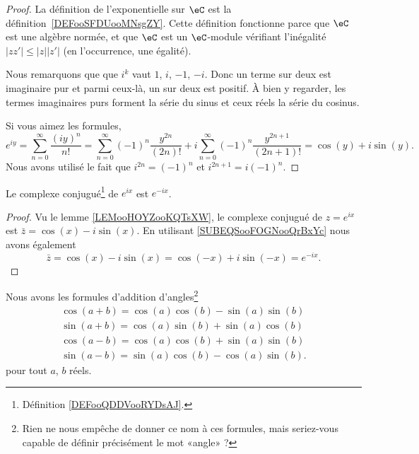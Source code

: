\begin{proof}
    La définition de l'exponentielle sur \( \eC\) est la définition~\ref{DEFooSFDUooMNsgZY}. Cette définition fonctionne parce que \( \eC\) est une algèbre normée, et que \( \eC\) est un \( \eC\)-module vérifiant l'inégalité \(  | zz' |\leq | z | |z' | \) (en l'occurrence, une égalité).

    Nous remarquons que que \( i^k\) vaut \( 1\), \( i\), \( -1\), \( -i\). Donc un terme sur deux est imaginaire pur et parmi ceux-là, un sur deux est positif. À bien y regarder, les termes imaginaires purs forment la série du sinus et ceux réels la série du cosinus.

    Si vous aimez les formules,
    \begin{equation}
            e^{iy}=\sum_{n=0}^{\infty}\frac{ (iy)^n }{ n! }
            =\sum_{n=0}^{\infty}(-1)^n\frac{ y^{2n} }{ (2n)! }+i\sum_{n=0}^{\infty}(-1)^n\frac{ y^{2n+1} }{ (2n+1)! }
            =\cos(y)+i\sin(y).
    \end{equation}
    Nous avons utilisé le fait que \( i^{2n}=(-1)^n\) et \( i^{2n+1}=i(-1)^n\).
\end{proof}

\begin{corollary}       \label{CORooWZFIooDTCoRo}
    Le complexe conjugué\footnote{Définition \ref{DEFooQDDVooRYDsAJ}.} de \(  e^{ix}\) est \(  e^{-ix}\).
\end{corollary}

\begin{proof}
    Vu le lemme \ref{LEMooHOYZooKQTsXW}, le complexe conjugué de \(  z=e^{ix}\) est \(\bar z= \cos(x)-i\sin(x)\). En utilisant \eqref{SUBEQSooFOGNooQrBxYc} nous avons également
    \begin{equation}
        \bar z=\cos(x)-i\sin(x)=\cos(-x)+i\sin(-x)= e^{-ix}.
    \end{equation}
\end{proof}

\begin{lemma}       \label{LEMooJAWBooJGfZIL}
    Nous avons les formules d'addition d'angles\footnote{Rien ne nous empêche de donner ce nom à ces formules, mais seriez-vous capable de définir précisément le mot «angle» ?}
    \begin{subequations}        \label{SUBEQSooFSSMooHcYwRc}
        \begin{align}
            \cos(a+b)=\cos(a)\cos(b)-\sin(a)\sin(b) \label{EQooJYEMooQaOMib}\\
            \sin(a+b)=\cos(a)\sin(b)+\sin(a)\cos(b) \label{EQooECAUooQzckDv}\\
            \cos(a-b)=\cos(a)\cos(b)+\sin(a)\sin(b) \label{EQooCVZAooQfocya}\\
            \sin(a-b)=\sin(a)\cos(b)-\cos(a)\sin(b).
        \end{align}
    \end{subequations}
    pour tout \( a\), \( b\) réels.
\end{lemma}

